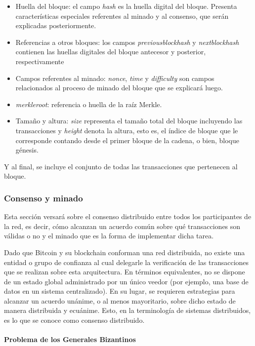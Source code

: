 \begin{itemize}
  \item Huella del bloque: el campo \textit{hash} es la huella digital del bloque. Presenta características especiales referentes al minado y al consenso, que serán explicadas posteriormente.
  \item Referencias a otros bloques: los campos \textit{previousblockhash} y \textit{nextblockhash} contienen las huellas digitales del bloque antecesor y posterior, respectivamente
  \item Campos referentes al minado: \textit{nonce}, \textit{time} y \textit{difficulty} son campos relacionados al proceso de minado del bloque que se explicará luego.
  \item \textit{merkleroot}: referencia o huella de la raíz Merkle.
  \item Tamaño y altura: \textit{size} representa el tamaño total del bloque incluyendo las transacciones y \textit{height} denota la altura, esto es, el índice de bloque que le corresponde contando desde el primer bloque de la cadena, o bien, bloque génesis.
\end{itemize}

Y al final, se incluye el conjunto de todas las transacciones que pertenecen al bloque.

\subsubsection{Consenso y minado}

Esta sección versará sobre el consenso distribuido entre todos los participantes de la red, es decir, cómo alcanzan un acuerdo común sobre qué transacciones son válidas o no y el minado que es la forma de implementar dicha tarea.

Dado que Bitcoin y su blockchain conforman una red distribuida, no existe una entidad o grupo de confianza al cual delegarle la verificación de las transacciones que se realizan sobre esta arquitectura. En términos equivalentes, no se dispone de un estado global administrado por un único veedor (por ejemplo, una base de datos en un sistema centralizado). En su lugar, se requieren estrategias para alcanzar un acuerdo unánime, o al menos mayoritario, sobre dicho estado de manera distribuida y ecuánime. Esto, en la terminología de sistemas distribuidos, es lo que se conoce como consenso distribuido.

\paragraph{Problema de los Generales Bizantinos}
\label{bc_bitcoin_gbp}

